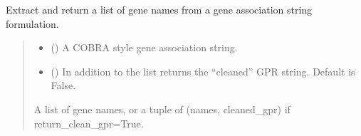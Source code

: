 \documentclass[letterpaper,12pt,english]{sphinxmanual}
\begin{document}
\begin{fulllineitems}
\label{\detokenize{api/core:cbmpy.CBCommon.extractGeneIdsFromString}}
\pysigstartsignatures
\pysiglinewithargsret
{}
{\sphinxparamcomma {}}
{}
\pysigstopsignatures
\sphinxAtStartPar
Extract and return a list of gene names from a gene association string
formulation.
\begin{quote}\begin{description}
\begin{itemize}
\item {} 
\sphinxAtStartPar
{} () \textendash{} A COBRA style gene association string.

\item {} 
\sphinxAtStartPar
{} (\sphinxstyleliteralemphasis{\sphinxupquote{, }}) \textendash{} In addition to the list returns the “cleaned” GPR string. Default is False.

\end{itemize}

\sphinxAtStartPar
{} \textendash{} A list of gene names, or a tuple of (names, cleaned\_gpr) if return\_clean\_gpr=True.

\end{description}\end{quote}

\end{fulllineitems}

\end{document}
